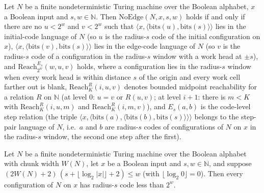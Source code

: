 \begin{theorem}
\label{Complexity.LogProg.SavitchARM.noEdge_iff}
\leanok
{}
Let $N$ be a finite nondeterministic Turing machine over the Boolean alphabet, $x$ a Boolean
input and $s,w\in\mathbb N$. Then $\mathrm{NoEdge}(N,x,s,w)$ holds if and only if there are no
$u<2^w$ and $v<2^w$ such that $\langle x,\langle\mathrm{bits}(u),\mathrm{bits}(s)\rangle\rangle$
lies in the initial-code language of $N$ (so $u$ is the radius-$s$ code of the initial
configuration on $x$), $\langle x,\langle\mathrm{bits}(v),\mathrm{bits}(s)\rangle\rangle$ lies in
the edge-code language of $N$ (so $v$ is the radius-$s$ code of a configuration in the
radius-$s$ window with a work head at $\pm s$), and $\mathrm{Reach}_{2^w}^{E_s}(w,u,v)$ holds,
where a configuration lies in the radius-$s$ window when every work head is within distance $s$ of the origin and every work cell farther out is blank, $\mathrm{Reach}_K^R(i,u,v)$ denotes bounded midpoint reachability for a relation $R$ on $\mathbb N$ (at level $0$: $u=v$ or $R(u,v)$; at level $i+1$: there is $m<K$ with $\mathrm{Reach}_K^R(i,u,m)$ and $\mathrm{Reach}_K^R(i,m,v)$), and $E_s(a,b)$ is the code-level step relation (the triple $\langle x,\langle\mathrm{bits}(a),\langle\mathrm{bits}(b),\mathrm{bits}(s)\rangle\rangle\rangle$ belongs to the step-pair language of $N$, i.e.\ $a$ and $b$ are radius-$s$ codes of configurations of $N$ on $x$ in the radius-$s$ window, the second one step after the first).
\end{theorem}

\begin{theorem}
\label{Complexity.LogProg.SavitchARM.window_code_lt}
\leanok
{}
Let $N$ be a finite nondeterministic Turing machine over the Boolean alphabet with chunk width
$W(N)$, let $x$ be a Boolean input and $s,w\in\mathbb N$, and suppose
$(2W(N)+2)\,(s+\lfloor\log_2|x|\rfloor+2)\le w$ (with $\lfloor\log_2 0\rfloor=0$). Then every
configuration of $N$ on $x$ has radius-$s$ code less than $2^w$.
\end{theorem}

